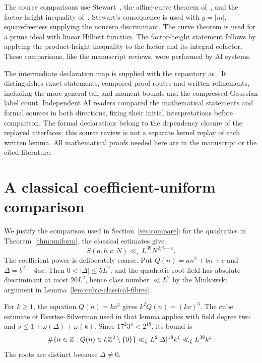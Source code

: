 \documentclass[11pt,reqno]{amsart}
\theoremstyle{definition}
\theoremstyle{remark}
\numberwithin{equation}{section}
\newcommand{\eps}{\varepsilon}\newcommand{\card}{\#}
\begin{document}
The source comparisons use Stewart~\cite[Theorem~1, p.~795 and its
consequence on p.~796]{stewart}, the affine-curve theorem
of~\cite[Theorem~3]{ccdn}, and the factor-height inequality
of~\cite[Lemma~1.6.11, p.~27]{bg}. Stewart's consequence is used with
$g=|m|$, squarefreeness supplying the nonzero discriminant. The curve
theorem is used for a prime ideal with linear Hilbert function. The
factor-height statement follows by applying the product-height inequality
to the factor and its integral cofactor. These comparisons, like the
manuscript reviews, were performed by AI systems.

The intermediate declaration map is supplied with the repository as
.
It distinguishes exact statements, composed proof routes and written
refinements, including the more general tail and moment bounds and the
compressed Gaussian label count. Independent AI readers compared the
mathematical statements and formal sources in both directions, fixing
their initial interpretations before comparison. The formal declarations
belong to the dependency closure of the replayed interfaces; this source
review is not a separate kernel replay of each written lemma. All
mathematical proofs needed here are in the manuscript or the cited literature.

\section{A classical coefficient-uniform comparison}\label{app:classical}
We justify the comparison used in Section~\ref{sec:compare}: for the
quadratics in Theorem~\ref{thm:uniform}, the classical estimates give
\begin{equation}\label{eq:classical-quadratic}
 S(a,b,c;N)\ll_\eps L^{39}N^{2/5+\eps}.
\end{equation}
The coefficient power is deliberately coarse. Put $Q(n)=an^2+bn+c$
and $\Delta=b^2-4ac$. Then $0<|\Delta|\le5L^2$, and the quadratic
root field has absolute discriminant at most $20L^2$, hence class
number $\ll L^2$ by the Minkowski argument in
Lemma~\ref{lem:cubic-classical-fibres}.

For $k\ge1$, the equation $Q(n)=kv^3$ gives
$k^2Q(n)=(kv)^3$. The cube estimate of Evertse--Silverman
used in that lemma applies with field degree two and
$s\le1+\omega(\Delta)+\omega(k)$. Since $17^2 3^4<2^{18}$,
its bound is
\[
 \card\{n\in\Z:Q(n)\in k\Z^3\setminus\{0\}\}
 \ll_\xi L^2|\Delta|^{18}k^\xi
 \ll_\xi L^{38}k^\xi.
\]
The roots are distinct because $\Delta\ne0$.
\end{document}
